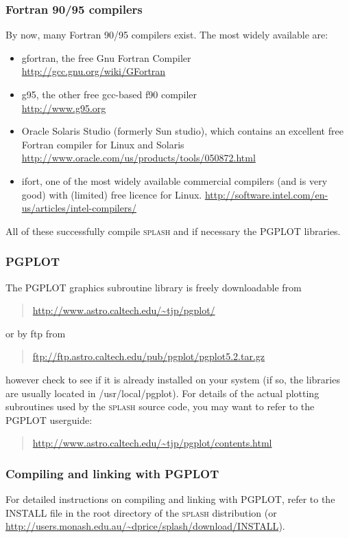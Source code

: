 \documentclass[a4paper,10pt]{article}
\newcommand{\splash}{\textsc{splash }}
\begin{document}
\subsubsection{ Fortran 90/95 compilers}
 By now, many Fortran 90/95 compilers exist. The most widely available are:
 \begin{itemize}
\item gfortran, the free Gnu Fortran Compiler \\\url{http://gcc.gnu.org/wiki/GFortran}
\item g95, the other free gcc-based f90 compiler\\ \url{http://www.g95.org}
\item Oracle Solaris Studio (formerly Sun studio), which contains an excellent free Fortran compiler for Linux and Solaris \\
\url{http://www.oracle.com/us/products/tools/050872.html}
\item ifort, one of the most widely available commercial compilers (and is very good) with (limited) free licence for Linux.
\url{http://software.intel.com/en-us/articles/intel-compilers/}
\end{itemize}
All of these successfully compile \splash and if necessary the PGPLOT libraries.

\subsubsection{ PGPLOT}
 The PGPLOT graphics subroutine library is freely downloadable from
\begin{quote}
\url{http://www.astro.caltech.edu/~tjp/pgplot/}
\end{quote}
or by ftp from
\begin{quote}
\url{ftp://ftp.astro.caltech.edu/pub/pgplot/pgplot5.2.tar.gz}
\end{quote}
however check to see if it is already installed on your system (if so, the libraries are
usually located in /usr/local/pgplot). For details of the actual plotting subroutines
used by the \splash source code, you may want to refer to the PGPLOT userguide:
\begin{quote}
\url{http://www.astro.caltech.edu/~tjp/pgplot/contents.html}
\end{quote}

\subsubsection{ Compiling and linking with PGPLOT}
For detailed instructions on compiling and linking with PGPLOT, refer to the INSTALL file in the root directory of the \splash distribution (or \url{http://users.monash.edu.au/~dprice/splash/download/INSTALL}).
\end{document}
